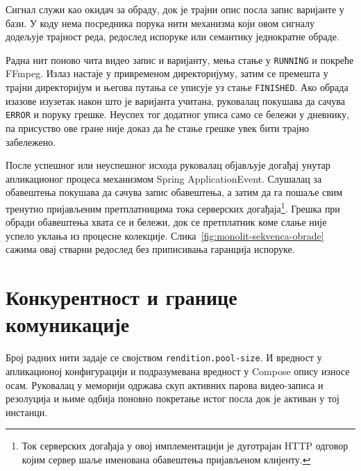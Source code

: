\documentclass[12pt,oneside]{memoir}
\begin{document}

Сигнал служи као окидач за обраду, док је трајни опис посла запис варијанте у
бази. У коду нема посредника порука нити механизма који овом сигналу додељује
трајност реда, редослед испоруке или семантику једнократне обраде.

Радна нит поново чита видео запис и варијанту, мења стање у
\texttt{RUNNING} и покреће {\lat FFmpeg}. Излаз настаје у привременом
директоријуму, затим се премешта у трајни директоријум и његова путања се
уписује уз стање \texttt{FINISHED}. Ако обрада изазове изузетак након што је
варијанта учитана, руковалац покушава да сачува \texttt{ERROR} и поруку
грешке. Неуспех тог додатног уписа само се бележи у дневнику, па присуство ове
гране није доказ да ће стање грешке увек бити трајно забележено.

После успешног или неуспешног исхода руковалац објављује догађај унутар
апликационог процеса механизмом {\lat Spring ApplicationEvent}. Слушалац за
обавештења покушава да сачува запис обавештења, а затим да га пошаље свим
тренутно пријављеним претплатницима тока серверских
догађаја\footnote{Ток серверских догађаја у овој имплементацији је дуготрајан
{\lat HTTP} одговор којим сервер шаље именована обавештења пријављеном
клијенту.}. Грешка при
обради обавештења хвата се и бележи, док се претплатник коме слање није успело
уклања из процесне колекције. Слика~\ref{fig:monolit-sekvenca-obrade} сажима овај
стварни редослед без приписивања гаранција испоруке.


\section{Конкурентност и границе комуникације}

Број радних нити задаје се својством \texttt{rendition.pool-size}. И вредност у
апликационој конфигурацији и подразумевана вредност у {\lat Compose} опису
износе осам. Руковалац у меморији одржава скуп активних парова видео-записа и
резолуција и њиме одбија поновно покретање истог посла док је активан у тој
инстанци.

\end{document}
